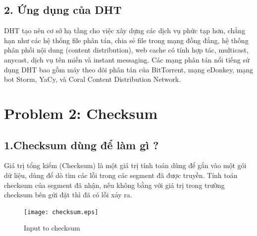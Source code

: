 \documentclass[12pt,a4paper]{article}
\begin{document}
\subsection*{2.\; Ứng dụng của DHT}
DHT tạo nên cơ sở hạ tầng cho việc xây dựng các dịch vụ phức tạp hơn, chẳng hạn như các hệ thống file phân tán, chia sẻ file trong mạng đồng đẳng, hệ thống phân phối nội dung (content distribution), web cache có tính hợp tác, multicast, anycast, dịch vụ tên miền và instant messaging. Các mạng phân tán nổi tiếng sử dụng DHT bao gồm máy theo dõi phân tán của BitTorrent, mạng eDonkey, mạng bot Storm, YaCy, và Coral Content Distribution Network.

\newpage
\section*{Problem 2: Checksum}
\subsection*{1.\;Checksum dùng để làm gì ?}
Giá trị tổng kiểm (Checksum) là một giá trị tính toán dùng để gắn vào một gói dữ liệu, dùng để dò tìm các lỗi trong các segment đã được truyền. Tính toán checksum của segment đã nhận, nếu không bằng với giá trị trong trường checksum bên gửi đặt thì đã có lỗi xảy ra.

\begin{figure}[h]
    \centering
    \texttt{[image: checksum.eps]}
    \caption{Input to checksum}
\end{figure}
\end{document}
